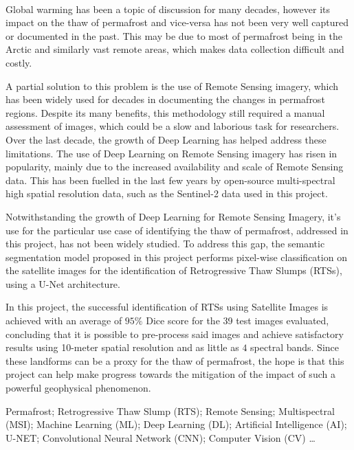 \paragraph{}
Global warming has been a topic of discussion for many decades, however its impact on the thaw of permafrost and vice-versa has not been very well captured or documented in the past. This may be due to most of permafrost being in the Arctic and similarly vast remote areas, which makes data collection difficult and costly.

A partial solution to this problem is the use of Remote Sensing imagery, which has been widely used for decades in documenting the changes in permafrost regions. Despite its many benefits, this methodology still required a manual assessment of images, which could be a slow and laborious task for researchers.
Over the last decade, the growth of Deep Learning has helped address these limitations. The use of Deep Learning on Remote Sensing imagery has risen in popularity, mainly due to the increased availability and scale of Remote Sensing data. This has been fuelled in the last few years by open-source multi-spectral high spatial resolution data, such as the Sentinel-2 data used in this project.

Notwithstanding the growth of Deep Learning for Remote Sensing Imagery, it’s use for the particular use case of identifying the thaw of permafrost, addressed in this project, has not been widely studied. To address this gap, the semantic segmentation model proposed in this project performs pixel-wise classification on the satellite images for the identification of Retrogressive Thaw Slumps (RTSs), using a U-Net architecture.

In this project, the successful identification of RTSs using Satellite Images is achieved with an average of $95\%$ Dice score for the 39 test images evaluated, concluding that it is possible to pre-process said images and achieve satisfactory results using 10-meter spatial resolution and as little as $4$ spectral bands. Since these landforms can be a proxy for the thaw of permafrost, the hope is that this project can help make progress towards the mitigation of the impact of such a powerful geophysical phenomenon.


\begin{keywords}
Permafrost; Retrogressive Thaw Slump (RTS); Remote Sensing;  Multispectral (MSI); Machine Learning (ML); Deep Learning (DL); Artificial Intelligence (AI); U-NET; Convolutional Neural Network (CNN); Computer Vision (CV) \ldots
\end{keywords} 
